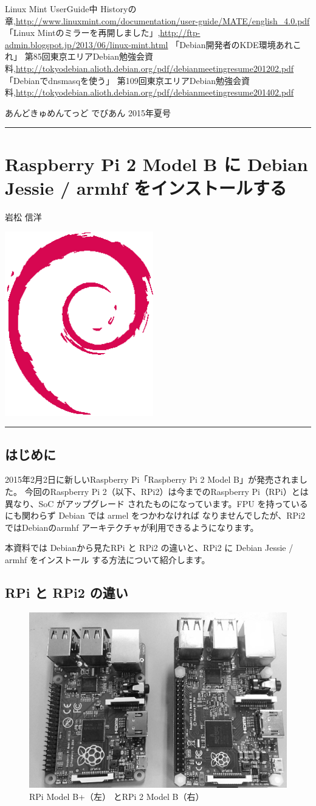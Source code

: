 \documentclass[mingoth,a4paper]{jsarticle}
\renewcommand{\dancersection}[2]{%
\newpage
あんどきゅめんてっど でびあん 2015年夏号
%
\vspace{0.1mm}\\
{\color{dancerdarkblue}\rule{\hsize}{2mm}}

%
%
\begin{minipage}[t]{0.6\hsize}
\color{dancerdarkblue}
\vspace{1cm}
\section{#1}
\hfill{}#2\\
\end{minipage}
\begin{minipage}[t]{0.4\hsize}
\vspace{-2cm}
\hfill{}\includegraphics[height=8cm]{image200502/openlogo-nd.eps}\\
\vspace{-5cm}
\end{minipage}
%
{\color{dancerlightblue}\rule{0.66\hsize}{2mm}}
%
\vspace{2cm}
}
\begin{document}
\begin{thebibliography}{9}
 Linux Mint UserGuide中 Historyの章,\url{http://www.linuxmint.com/documentation/user-guide/MATE/english_4.0.pdf}
 「Linux Mintのミラーを再開しました」,\url{http://ftp-admin.blogspot.jp/2013/06/linux-mint.html}
「Debian開発者のKDE環境あれこれ」 第85回東京エリアDebian勉強会資料,\url{http://tokyodebian.alioth.debian.org/pdf/debianmeetingresume201202.pdf}
  「Debianでdnsmasqを使う」 第109回東京エリアDebian勉強会資料,\url{http://tokyodebian.alioth.debian.org/pdf/debianmeetingresume201402.pdf}
\end{thebibliography}

\dancersection{Raspberry Pi 2 Model B に Debian Jessie / armhf をインストールする}{岩松 信洋}
 \subsection{はじめに}

2015年2月2日に新しいRaspberry Pi「Raspberry Pi 2 Model B」が発売されました。
今回のRaspberry Pi 2（以下、RPi2）は今までのRaspberry Pi（RPi）とは異なり、SoC がアップグレード
されたものになっています。FPU を持っているにも関わらず Debian では armel をつかわなければ
なりませんでしたが、RPi2ではDebianのarmhf アーキテクチャが利用できるようになります。

本資料では Debianから見たRPi と RPi2 の違いと、RPi2 に Debian Jessie / armhf をインストール
する方法について紹介します。

\subsection{RPi と RPi2 の違い}

\begin{figure}[htbp]
\begin{center}
\includegraphics[width=0.7\hsize]{image201503/rpis_mono.png}
\end{center}
\caption{RPi Model B+（左） とRPi 2 Model B（右）}
\label{fig:rpis}
\end{figure}
\end{document}
